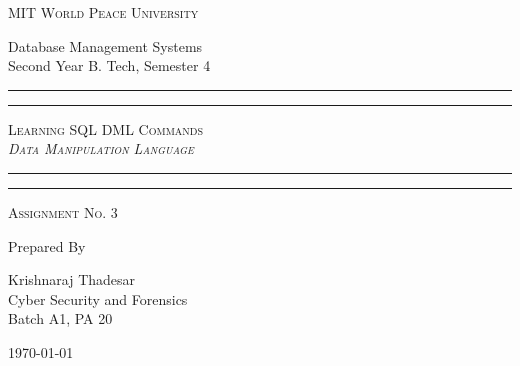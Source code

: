 \documentclass[11pt]{article}
\begin{document}
\begin{titlepage}
	\centering


	\huge\textsc{
		MIT World Peace University
	}\\

	\vspace{0.75\baselineskip} %

	\LARGE{
		Database Management Systems\\
		Second Year B. Tech, Semester 4
	}

	\vfill %


	\rule{\textwidth}{1.6pt}\vspace*{-\baselineskip}\vspace*{2pt}
	\rule{\textwidth}{0.6pt}
	\vspace{0.75\baselineskip} %



	\huge{\textsc{
			Learning SQL DML Commands\\
			\textit{Data Manipulation Language}
		}} \\



	\vspace{0.5\baselineskip} %
	\rule{\textwidth}{0.6pt}\vspace*{-\baselineskip}\vspace*{2.8pt}
	\rule{\textwidth}{1.6pt}

	\vspace{1\baselineskip} %


	\LARGE\textsc{
		Assignment No. 3
	} %
	\vfill


	Prepared By
	\vspace{0.5\baselineskip} %

	\Large{
		Krishnaraj Thadesar \\
		Cyber Security and Forensics\\
		Batch A1, PA 20
	}


	\vspace{0.5\baselineskip} %
	\today

\end{titlepage}
\end{document}

